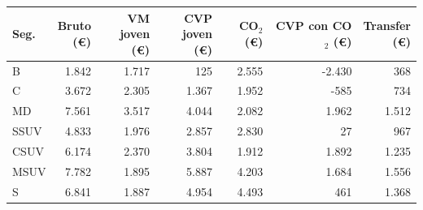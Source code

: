 \begin{tabular}{lrrrrrr}
\toprule
Seg. & \makecell{Bruto\\(\euro)} & \makecell{VM joven\\(\euro)} & \makecell{CVP joven\\(\euro)} & \makecell{CO$_2$\\(\euro)} & \makecell{CVP con\\CO$_2$ (\euro)} & \makecell{Transfer\\(\euro)} \\
\midrule
B & 1.842 & 1.717 & 125 & 2.555 & -2.430 & 368 \\
C & 3.672 & 2.305 & 1.367 & 1.952 & -585 & 734 \\
MD & 7.561 & 3.517 & 4.044 & 2.082 & 1.962 & 1.512 \\
SSUV & 4.833 & 1.976 & 2.857 & 2.830 & 27 & 967 \\
CSUV & 6.174 & 2.370 & 3.804 & 1.912 & 1.892 & 1.235 \\
MSUV & 7.782 & 1.895 & 5.887 & 4.203 & 1.684 & 1.556 \\
S & 6.841 & 1.887 & 4.954 & 4.493 & 461 & 1.368 \\
\bottomrule
\end{tabular}
